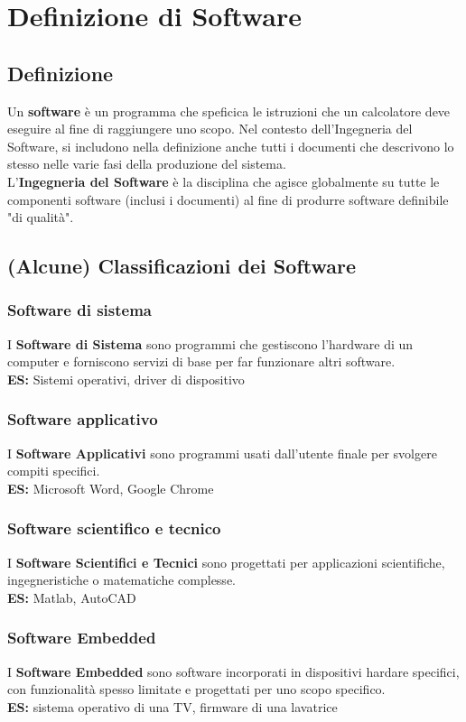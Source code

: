 \chapter{Definizione di Software}
\label{chap:software}
\section{Definizione}
Un \textbf{software} è un programma che speficica le istruzioni che un calcolatore deve eseguire al fine di raggiungere uno scopo. Nel contesto dell'Ingegneria del Software, si includono nella definizione anche tutti i documenti che descrivono lo stesso nelle varie fasi della produzione del sistema. \\
L'\textbf{Ingegneria del Software} è la disciplina che agisce globalmente su tutte le componenti software (inclusi i documenti) al fine di produrre software definibile "di qualità". 
\section{(Alcune) Classificazioni dei Software}
\subsection{Software di sistema}
I \textbf{Software di Sistema} sono programmi che gestiscono l'hardware di un computer e forniscono servizi di base per far funzionare altri software. \\ 
\textbf{ES:} Sistemi operativi, driver di dispositivo
\subsection{Software applicativo}
I \textbf{Software Applicativi} sono programmi usati dall'utente finale per svolgere compiti specifici. \\
\textbf{ES:} Microsoft Word, Google Chrome
\subsection{Software scientifico e tecnico}
I \textbf{Software Scientifici e Tecnici} sono progettati per applicazioni scientifiche, ingegneristiche o matematiche complesse. \\
\textbf{ES:} Matlab, AutoCAD
\subsection{Software Embedded}
I \textbf{Software Embedded} sono software incorporati in dispositivi hardare specifici, con funzionalità spesso limitate e progettati per uno scopo specifico. \\
\textbf{ES:} sistema operativo di una TV, firmware di una lavatrice
